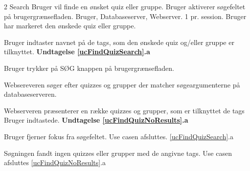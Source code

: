 \uchead
	{2}
	{Search}
	{Bruger vil finde en ønsket quiz eller gruppe.}
	{Bruger aktiverer søgefeltet på brugergrænsefladen.}
	{Bruger, Databaseserver, Webserver.}
	{} %
	{}
	{1 pr. session.}
	{Bruger har markeret den ønskede quiz eller gruppe.}

\item \label{ucFindQuizSearch} Bruger indtaster navnet på de tags, som den ønskede quiz og/eller gruppe er tilknyttet. 
\textbf{Undtagelse \ref{ucFindQuizSearch}.a}
\item Bruger trykker på SØG knappen på brugergrænsefladen.
\item Websereveren søger efter quizzes og grupper der matcher søgeargumenterne på databaseserveren.

\item \label{ucFindQuizNoResults} Webserveren præsenterer en række quizzes og grupper, som er tilknyttet de tags Bruger indtastede.
\textbf{Undtagelse \ref{ucFindQuizNoResults}.a}


\ucdescriptionend

\ucextension
	{Bruger fjerner fokus fra søgefeltet.}
	{Use casen afsluttes.}
	{\ref{ucFindQuizSearch}.a}

\ucextension
	{Søgningen fandt ingen quizzes eller grupper med de angivne tags.}
	{Use casen afsluttes}
	{\ref{ucFindQuizNoResults}.a}
				
